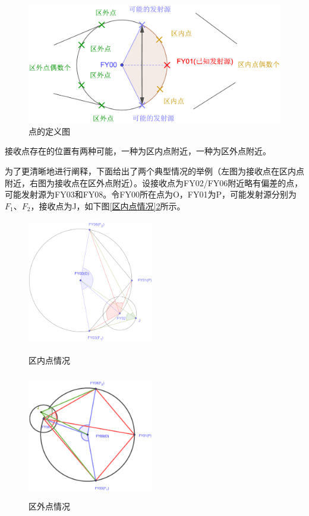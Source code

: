 \documentclass{ctexart}
\begin{document}
\begin{figure}[H]
  \centering
  \includegraphics[width=0.55\linewidth]{pic/regional_points.eps}
  \caption{点的定义图}
  \label{点的定义图}
  \end{figure}


接收点存在的位置有两种可能，一种为区内点附近，一种为区外点附近。

为了更清晰地进行阐释，下面给出了两个典型情况的举例（左图为接收点在区内点附近，右图为接收点在区外点附近）。设接收点为FY02/FY06附近略有偏差的点，可能发射源为FY03和FY08。令FY00所在点为O，FY01为P，可能发射源分别为$F_1$、$F_2$，接收点为J，如下图\ref{区内点情况}\ref{区外点情况}所示。

\begin{figure}[H]
  \begin{minipage}[t]{0.45\linewidth}
  \centering
  \includegraphics[height=5.5cm,width=5.5cm]{pic/error_circle1(1).eps}
  \caption{区内点情况}
  \label{区内点情况}
  \end{minipage}%
  \begin{minipage}[t]{0.45\linewidth}
  \centering
  \includegraphics[height=5.5cm,width=5.5cm]{pic/error_circle2.eps}
  \caption{区外点情况}
  \label{区外点情况}
  \end{minipage}
  \end{figure}
\end{document}
